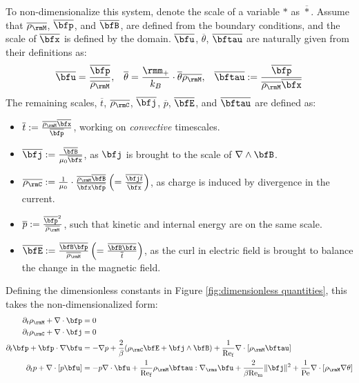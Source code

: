     To non-dimensionalize this system, denote the scale of a variable $*$ as $\overline{*}$. Assume that $\overline{\rho_{\rmM}}$, $\overline{\bfp}$, and $\overline{\bfB}$, are defined from the boundary conditions, and the scale of $\overline{\bfx}$ is defined by the domain. $\overline{\bfu}$, $\overline{\theta}$, $\overline{\bftau}$ are naturally given from their definitions as:
    \begin{align}
        \overline{\bfu}  =  \frac{\overline{\bfp}}{\overline{\rho_{\rmM}}},  &&
        \overline{\theta}  =  \frac{\rmm_{+}}{k_{B}}\cdot{\overline{\theta}\overline{\rho_{\rmM}}},  &&
        \overline{\bftau}  :=  \frac{\overline{\bfp}}{\overline{\rho_{\rmM}}\overline{\bfx}}
    \end{align}
    The remaining scales, $\overline{t}$, $\overline{\rho_{\rmC}}$, $\overline{\bfj}$, $\overline{p}$, $\overline{\bfE}$, and $\overline{\bftau}$ are defined as:  
    \begin{itemize}
        \item  $\overline{t}  :=  \frac{\overline{\rho_{\rmM}}\overline{\bfx}}{\overline{\bfp}}$, working on \emph{convective} timescales.
        \item  $\overline{\bfj}  :=  \frac{\overline{\bfB}}{\mu_{0}\overline{\bfx}}$, as $\bfj$ is brought to the scale of $\nabla\wedge\bfB$.
        \item  $\overline{\rho_{\rmC}}  :=  \frac{1}{\mu_{0}}\cdot\frac{\overline{\rho_{\rmM}}\overline{\bfB}}{\overline{\bfx}\overline{\bfp}}  \left(=  \frac{\overline{\bfj}\overline{t}}{\overline{\bfx}}\right)$, as charge is induced by divergence in the current.
        \item  $\overline{p}  :=  \frac{\overline{\bfp}^{2}}{\overline{\rho_{\rmM}}}$, such that kinetic and internal energy are on the same scale.
        \item  $\overline{\bfE}  :=  \frac{\overline{\bfB}\overline{\bfp}}{\overline{\rho_{\rmM}}}  \left(=  \frac{\overline{\bfB}\overline{\bfx}}{\overline{t}}\right)$, as the curl in electric field is brought to balance the change in the magnetic field.
    \end{itemize}
    Defining the dimensionless constants in Figure \ref{fig:dimensionless quantities}, this takes the non-dimensionalized form:
    \begin{align}
        \partial_{t}\rho_{\rmM} + \nabla\cdot\bfp  &=  0  \\
        \partial_{t}\rho_{\rmC} + \nabla\cdot\bfj  &=  0  \\
        \partial_{t}\bfp + \bfp\cdot\nabla\bfu  &=  - \nabla p + \frac{2}{\beta}(\rho_{\rmC}\bfE + \bfj\wedge\bfB) + \frac{1}{\rmRef}\nabla\cdot[\rho_{\rmM}\bftau]  \\
        \partial_{t}p + \nabla\cdot[p\bfu]  &=  - p\nabla\cdot\bfu + \frac{1}{\rmRef}\rho_{\rmM}\bftau:\nabla_{\rms}\bfu + \frac{2}{\beta\rmRem}\|\bfj\|^{2} + \frac{1}{\rmPe}\nabla\cdot[\rho_{\rmM}\nabla\theta]
    \end{align}
